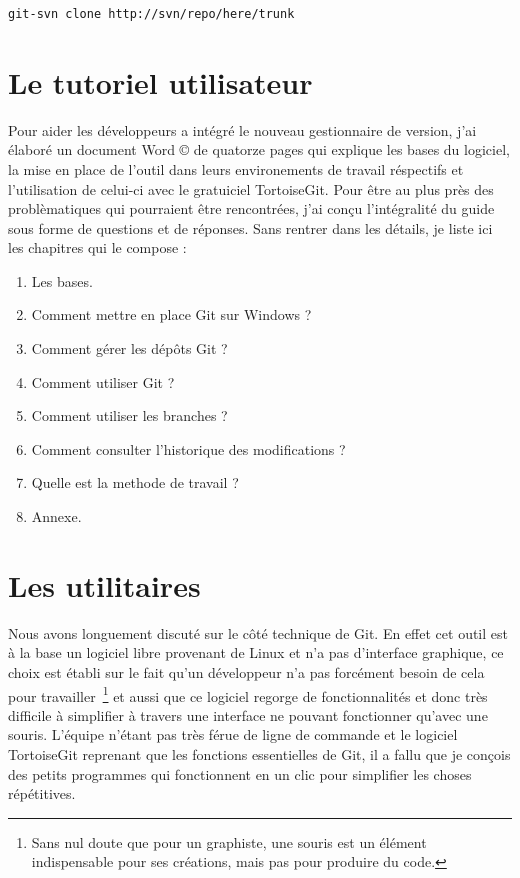 \begin{lstlisting}[basicstyle=\ttfamily\small, frame=trBL]
git-svn clone http://svn/repo/here/trunk
\end{lstlisting}

\section{Le tutoriel utilisateur} %
\label{sec:Le tutoriel utilisateur}

Pour aider les développeurs a intégré le nouveau gestionnaire de
version, j'ai élaboré un document Word \copyright{} de quatorze pages
qui explique les bases du logiciel, la mise en place de l'outil dans
leurs environements de travail réspectifs et l'utilisation de celui-ci
avec le gratuiciel TortoiseGit.  Pour être au plus près des
problèmatiques qui pourraient être rencontrées, j'ai conçu l'intégralité
du guide sous forme de questions et de réponses. Sans rentrer dans les
détails, je liste ici les chapitres qui le compose :

\begin{enumerate}
    \item Les bases.
    \item Comment mettre en place Git sur Windows ?
    \item Comment gérer les dépôts Git ?
    \item Comment utiliser Git ?
    \item Comment utiliser les branches ?
    \item Comment consulter l'historique des modifications ?
    \item Quelle est la methode de travail ?
    \item Annexe.
\end{enumerate}


\section{Les utilitaires} %

Nous avons longuement discuté sur le côté technique de Git. En effet cet outil
est à la base un logiciel libre provenant de Linux et n'a pas d'interface
graphique, ce choix est établi sur le fait qu'un développeur n'a pas forcément
besoin de cela pour travailler\, \footnote{Sans nul doute que pour un
graphiste, une souris est un élément indispensable pour ses créations, mais pas
pour produire du code.} et aussi que ce logiciel regorge de fonctionnalités et
donc très difficile à simplifier à travers une interface ne pouvant fonctionner
qu'avec une souris. L'équipe n'étant pas très férue de ligne de commande et le
logiciel TortoiseGit reprenant que les fonctions essentielles de Git, il a
fallu que je conçois des petits programmes qui fonctionnent en un clic pour
simplifier les choses répétitives.

